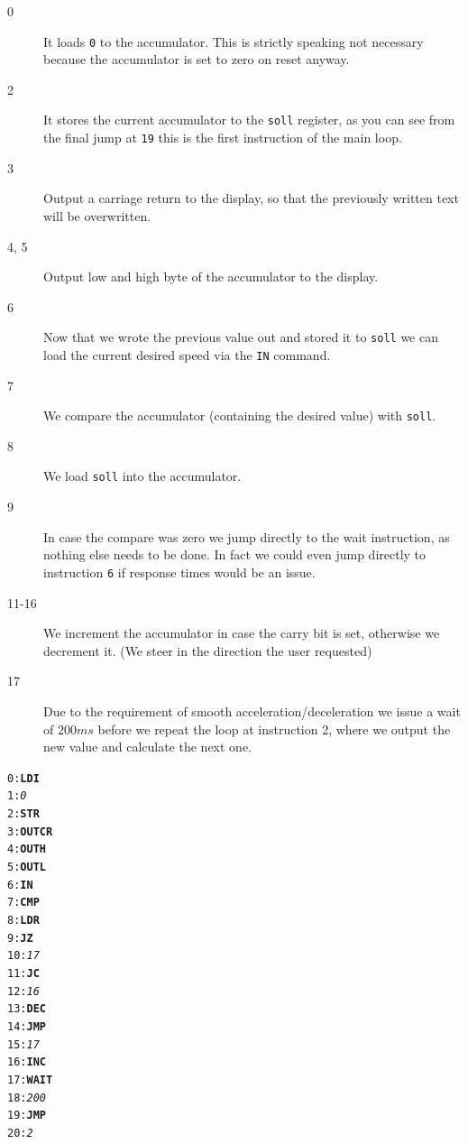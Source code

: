 \documentclass[a4paper,10pt]{scrartcl}
\begin{document}
\begin{minipage}[t]{0.85\linewidth}
  \begin{description}
  \item[0] It loads \texttt{0} to the accumulator. This is strictly speaking
    not necessary because the accumulator is set to zero on reset
    anyway.
  \item[2] It stores the current accumulator to the \texttt{soll} register, as
    you can see from the final jump at \texttt{19} this is the first
    instruction of the main loop.
  \item[3] Output a carriage return to the display, so that the previously
    written text will be overwritten.
  \item[4, 5] Output low and high byte of the accumulator to the display.
  \item[6] Now that we wrote the previous value out and stored it to
    \texttt{soll} we can load the current desired speed via the
    \texttt{IN} command.
  \item[7] We compare the accumulator (containing the desired value) with \texttt{soll}.
  \item[8] We load \texttt{soll} into the accumulator.
  \item[9] In case the compare was zero we jump directly to the wait
    instruction, as nothing else needs to be done. In fact we could even
    jump directly to instruction \texttt{6} if response times would be an
    issue.
  \item[11-16] We increment the accumulator in case the carry bit is set,
    otherwise we decrement it. (We steer in the direction the user
    requested)
  \item[17] Due to the requirement of smooth acceleration/deceleration we
    issue a wait of $200 ms$ before we repeat the loop at instruction 2,
    where we output the new value and calculate the next one.
  \end{description}
\end{minipage}
\begin{minipage}[t]{0.15\linewidth}
  \begin{alltt}\footnotesize
    0: \textbf{LDI }
    1: \textit{0}
    2: \textbf{STR}
    3: \textbf{OUTCR}
    4: \textbf{OUTH}
    5: \textbf{OUTL}
    6: \textbf{IN}
    7: \textbf{CMP}
    8: \textbf{LDR}
    9: \textbf{JZ }
    10: \textit{17}
    11: \textbf{JC }
    12: \textit{16}
    13: \textbf{DEC}
    14: \textbf{JMP }
    15: \textit{17}
    16: \textbf{INC}
    17: \textbf{WAIT }
    18: \textit{200}
    19: \textbf{JMP }
    20: \textit{2}
  \end{alltt} 
\end{minipage}
\end{document}
